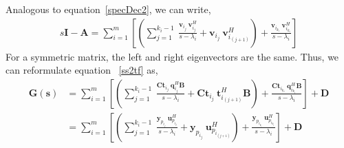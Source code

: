 Analogous to equation~\eqref{specDec2}, we can write,
\begin{align*}
    s\bm{I}-\bm{A} = \sum_{i=1}^m \left[\left(\sum_{j=1}^{k_i - 1}\: \frac{\bm{v}_{i_j}\:\bm{v}_{i_j}^H}{s-\lambda_i} +  \bm{v}_{i_j}\:\bm{v}_{i_{(j+1)}}^H\right) +  \frac{\bm{v}_{i_{k_i}}\:\bm{v}_{i_{k_i}}^H}{s-\lambda_i} \right]
\end{align*}
For a symmetric matrix, the left and right eigenvectors are the same. Thus, we can reformulate equation ~\eqref{ss2tf} as,
\begin{align*}
\bm{G(s)} &= \sum_{i=1}^m \left[\left(\sum_{j=1}^{k_i - 1}\: \frac{\bm{C}\bm{t}_{i_j}\:\bm{q}_{i_j}^H\bm{B}}{s-\lambda_i} +  \bm{C}\bm{t}_{i_j}\:\bm{t}_{i_{(j+1)}}^H\bm{B}\right) +  \frac{\bm{C}\bm{t}_{i_{k_i}}\:\bm{q}_{i_{k_i}}^H\bm{B}}{s-\lambda_i} \right] + \bm{D}\\
&=
\sum_{i=1}^m \left[\left(\sum_{j=1}^{k_i - 1}\: \frac{\bm{y}_{p_{i_j}}\:\bm{u}_{p_{i_j}}^H}{s-\lambda_i} +  \bm{y}_{p_{i_j}}\:\bm{u}_{p_{i_{(j+1)}}}^H\right) +  \frac{\bm{y}_{p_{i_{k_i}}}\:\bm{u}_{p_{i_{k_i}}}^H}{s-\lambda_i} \right] + \bm{D}\\
\end{align*}